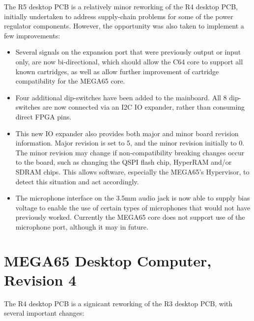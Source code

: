 The R5 desktop PCB is a relatively minor reworking of the R4 desktop PCB, initially undertaken to address supply-chain problems for some of the power regulator components. However, the opportunity was also taken to implement a few improvements:

\begin{itemize}
\item Several signals on the expansion port that were previously output or input only, are now bi-directional, which should allow the C64 core to support all known cartridges, as well as allow further improvement of cartridge compatibility for the MEGA65 core.
\item Four additional dip-switches have been added to the mainboard. All 8 dip-switches are now connected via an I2C IO expander, rather than consuming direct FPGA pins.
\item This new IO expander also provides both major and minor board revision information. Major revision is set to 5, and the minor revision initially to 0. The minor revision may change if non-compatibility breaking changes occur to the board, such as changing the QSPI flash chip, HyperRAM and/or SDRAM chips. This allows software, especially the MEGA65's Hypervisor, to detect this situation and act accordingly.
  \item The microphone interface on the 3.5mm audio jack is now able to supply bias voltage to enable the use of certain types of microphones that would not have previously worked.  Currently the MEGA65 core does not support use of the microphone port, although it may in future.
  
\end{itemize}

\section{MEGA65 Desktop Computer, Revision 4}

The R4 desktop PCB is a signicant reworking of the R3 desktop PCB, with several important changes:

